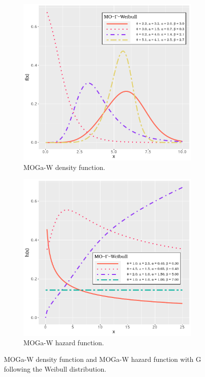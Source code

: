 \documentclass[twoside,leqno,11pt]{article}
\begin{document}
\begin{figure}
	\centering
	\begin{subfigure}[b]{0.49\textwidth}
		\centering
		\includegraphics[width=\textwidth]{pdf_function.pdf}
		\caption{MOGa-W density function.}
		\label{fig:pdf}
	\end{subfigure}
	\hfill
	\begin{subfigure}[b]{0.49\textwidth}
		\centering
		\includegraphics[width=\textwidth]{hazard_function.pdf}
		\caption{MOGa-W hazard function.}
		\label{fig:hazard}
	\end{subfigure}
\caption{MOGa-W density function and  MOGa-W hazard function with G following the Weibull distribution.}
\label{formas}
\end{figure}
\end{document}
